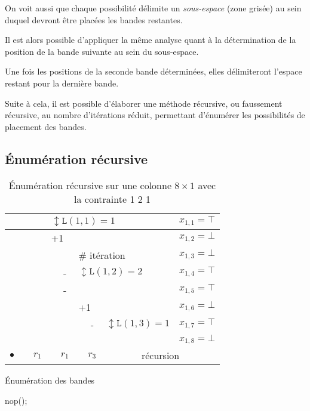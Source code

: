\documentclass[a4paper,12pt]{report}
\newcommand\black{\cellcolor{black}}
\newcommand\grey{\cellcolor{black!50}}
\begin{document}
On voit aussi que chaque possibilité délimite un \textit{sous-espace} (zone grisée) au sein duquel devront être placées les bandes restantes.

Il est alors possible d'appliquer la même analyse quant à la détermination de la position de la bande suivante au sein du sous-espace.

Une fois les positions de la seconde bande déterminées, elles délimiteront l'espace restant pour la dernière bande. 

Suite à cela, il est possible d'élaborer une méthode récursive, ou faussement récursive, au nombre d'itérations réduit, permettant d'énumérer les possibilités de placement des bandes.

\subsection{Énumération récursive}
\begin{table}[H]
\centering
\begin{tabular}{|c|c|c|l|c|l|c|c|c|}
\hline 
\grey &&\black & \multicolumn{5}{l|}{$\updownarrow \mathtt{L}(1,1) = 1$}& $x_{1,1}=\top$ \\ 
\hline 
\grey && & \multicolumn{5}{l|}{+1} & $x_{1,2}=\bot$ \\ 
\hline
\grey &&\grey &  &  & \multicolumn{3}{l|}{$\#$ itération}& $x_{1,3}=\bot$ \\ 
\hline 
\grey &&\grey &  & \black - & \multicolumn{3}{l|}{$\updownarrow \mathtt{L}(1,2) = 2$}& $x_{1,4}=\top$ \\ 
\cline{1-5}\cline{9-9}
\grey &&\grey &  & \black - & \multicolumn{3}{l|}{}& $x_{1,5}=\top$\\ 
\hline 
\grey &&\grey &  &  & \multicolumn{3}{l|}{+1} & $x_{1,6}=\bot$\\ 
\hline 
\grey &&\grey &  & \grey &  & \black - & $\updownarrow \mathtt{L}(1,3) = 1$ & $x_{1,7}=\top$ \\ 
\hline 
\grey &&\grey &  & \grey &  &  &  & $x_{1,8}=\bot$\\ 
\hline
\hline 
 $\bullet$&&$r_1$ &  & $r_1$ &  &$r_3$&  \multicolumn{2}{c|}{récursion}\\
\hline
\end{tabular}
\caption{\label{EnumBande} Énumération récursive sur une colonne $8\times1$ avec la contrainte 1 2 1}
\end{table}

 
\begin{algorithm}
\caption{Énumération des bandes}
\begin{algorithmic}
		nop();		
		\EndFor			
\EndFor
\end{algorithmic}
\end{algorithm}

	
						
\end{document}
